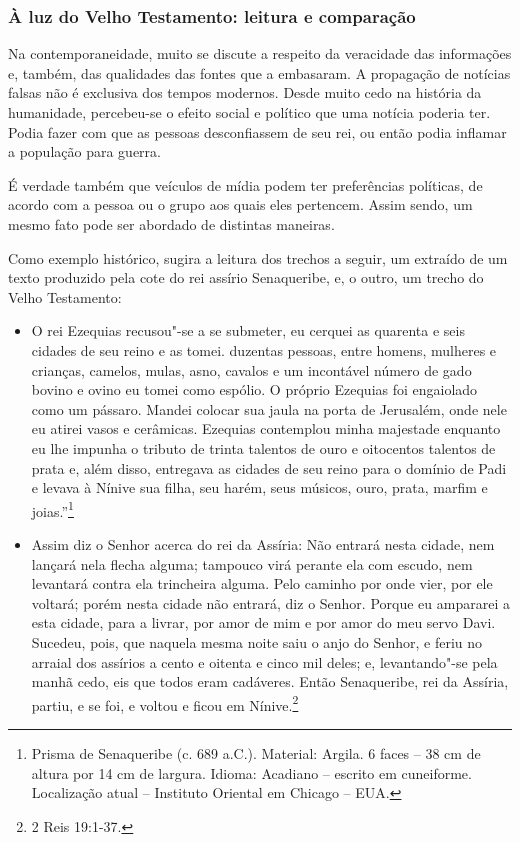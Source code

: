 \documentclass[12pt]{extarticle}
\begin{document}
\subsubsection{À luz do Velho Testamento: leitura e comparação}


Na contemporaneidade, muito se discute a respeito da veracidade das
informações e, também, das qualidades das fontes que a embasaram. A
propagação de notícias falsas não é exclusiva dos tempos modernos.
Desde muito cedo na história da humanidade, percebeu-se o efeito
social e político que uma notícia poderia ter. Podia fazer com que as
pessoas desconfiassem de seu rei, ou então podia inflamar a população
para guerra.

É verdade também que veículos de mídia podem ter preferências políticas,
de acordo com a pessoa ou o grupo aos quais eles pertencem. Assim sendo,
um mesmo fato pode ser abordado de distintas maneiras.

Como exemplo histórico, sugira a leitura dos trechos a seguir, um
extraído de um texto produzido pela cote do rei assírio Senaqueribe, e,
o outro, um trecho do Velho Testamento:

\begin{itemize}
\item
O rei Ezequias recusou"-se a se submeter, eu cerquei as quarenta e seis
cidades de seu reino e as tomei. duzentas pessoas, entre homens,
mulheres e crianças, camelos, mulas, asno, cavalos e um incontável
número de gado bovino e ovino eu tomei como espólio. O próprio
Ezequias foi engaiolado como um pássaro. Mandei colocar sua jaula na
porta de Jerusalém, onde nele eu atirei vasos e cerâmicas. Ezequias
contemplou minha majestade enquanto eu lhe impunha o tributo de trinta
talentos de ouro e oitocentos talentos de prata e, além disso,
entregava as cidades de seu reino para o domínio de Padi e levava à
Nínive sua filha, seu harém, seus músicos, ouro, prata, marfim e
joias.''\footnote{Prisma de Senaqueribe (c. 689 a.C.). Material: Argila. 6 faces -- 38 cm de altura por 14 cm de largura. Idioma: Acadiano -- escrito em
cuneiforme. Localização atual -- Instituto Oriental em Chicago --
EUA.}

\item
  Assim diz o Senhor acerca do rei da Assíria: Não entrará nesta cidade,
  nem lançará nela flecha alguma; tampouco virá perante ela com escudo,
  nem levantará contra ela trincheira alguma. Pelo caminho por onde
  vier, por ele voltará; porém nesta cidade não entrará, diz o Senhor.
  Porque eu ampararei a esta cidade, para a livrar, por amor de mim e
  por amor do meu servo Davi. Sucedeu, pois, que naquela mesma noite
  saiu o anjo do Senhor, e feriu no arraial dos assírios a cento e
  oitenta e cinco mil deles; e, levantando"-se pela manhã cedo, eis que
  todos eram cadáveres. Então Senaqueribe, rei da Assíria, partiu, e se
  foi, e voltou e ficou em Nínive.\footnote{2 Reis 19:1-37.}
\end{itemize}
\end{document}
